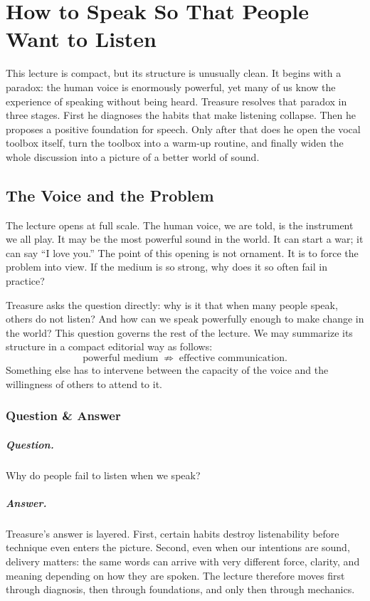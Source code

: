 \chapter{How to Speak So That People Want to Listen}

This lecture is compact, but its structure is unusually clean. It begins with a paradox: the human voice is enormously powerful, yet many of us know the experience of speaking without being heard. Treasure resolves that paradox in three stages. First he diagnoses the habits that make listening collapse. Then he proposes a positive foundation for speech. Only after that does he open the vocal toolbox itself, turn the toolbox into a warm-up routine, and finally widen the whole discussion into a picture of a better world of sound.

\section{The Voice and the Problem}

The lecture opens at full scale. The human voice, we are told, is the instrument we all play. It may be the most powerful sound in the world. It can start a war; it can say ``I love you.'' The point of this opening is not ornament. It is to force the problem into view. If the medium is so strong, why does it so often fail in practice?

Treasure asks the question directly: why is it that when many people speak, others do not listen? And how can we speak powerfully enough to make change in the world? This question governs the rest of the lecture. We may summarize its structure in a compact editorial way as follows:
\begin{equation}
\text{powerful medium} \;\not\Rightarrow\; \text{effective communication}.
\end{equation}
Something else has to intervene between the capacity of the voice and the willingness of others to attend to it.

\subsection{Question \& Answer}

\paragraph{Question.} Why do people fail to listen when we speak?

\paragraph{Answer.} Treasure's answer is layered. First, certain habits destroy listenability before technique even enters the picture. Second, even when our intentions are sound, delivery matters: the same words can arrive with very different force, clarity, and meaning depending on how they are spoken. The lecture therefore moves first through diagnosis, then through foundations, and only then through mechanics.

